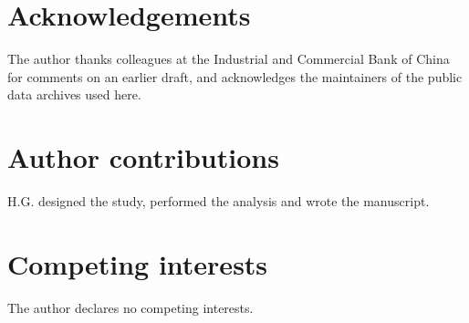 \documentclass[12pt]{article}
\newif\ifanon
\begin{document}





\ifanon\else
\section*{Acknowledgements}
The author thanks colleagues at the Industrial and Commercial Bank of China for comments on an earlier draft, and acknowledges the maintainers of the public data archives used here.

\section*{Author contributions}
H.G. designed the study, performed the analysis and wrote the manuscript.
\fi

\section*{Competing interests}
The author declares no competing interests.
\end{document}
